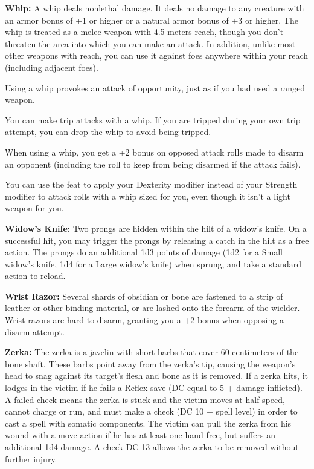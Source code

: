\textbf{Whip:} A whip deals nonlethal damage. It deals no damage to any creature with an armor bonus of +1 or higher or a natural armor bonus of +3 or higher. The whip is treated as a melee weapon with 4.5 meters reach, though you don't threaten the area into which you can make an attack. In addition, unlike most other weapons with reach, you can use it against foes anywhere within your reach (including adjacent foes).

Using a whip provokes an attack of opportunity, just as if you had used a ranged weapon.

You can make trip attacks with a whip. If you are tripped during your own trip attempt, you can drop the whip to avoid being tripped.

When using a whip, you get a +2 bonus on opposed attack rolls made to disarm an opponent (including the roll to keep from being disarmed if the attack fails).

You can use the  feat to apply your Dexterity modifier instead of your Strength modifier to attack rolls with a whip sized for you, even though it isn't a light weapon for you. 

\textbf{Widow's Knife:} Two prongs are hidden within the hilt of a widow's knife. On a successful hit, you may trigger the prongs by releasing a catch in the hilt as a free action. The prongs do an additional 1d3 points of damage (1d2 for a Small widow's knife, 1d4 for a Large widow's knife) when sprung, and take a standard action to reload.

\textbf{Wrist Razor:} Several shards of obsidian or bone are fastened to a strip of leather or other binding material, or are lashed onto the forearm of the wielder. Wrist razors are hard to disarm, granting you a +2 bonus when opposing a disarm attempt.

\textbf{Zerka:} The zerka is a javelin with short barbs that cover 60 centimeters of the bone shaft. These barbs point away from the zerka's tip, causing the weapon's head to snag against its target's flesh and bone as it is removed. If a zerka hits, it lodges in the victim if he fails a Reflex save (DC equal to 5 + damage inflicted). A failed check means the zerka is stuck and the victim moves at half-speed, cannot charge or run, and must make a  check (DC 10 + spell level) in order to cast a spell with somatic components. The victim can pull the zerka from his wound with a move action if he has at least one hand free, but suffers an additional 1d4 damage. A  check DC 13 allows the zerka to be removed without further injury.
